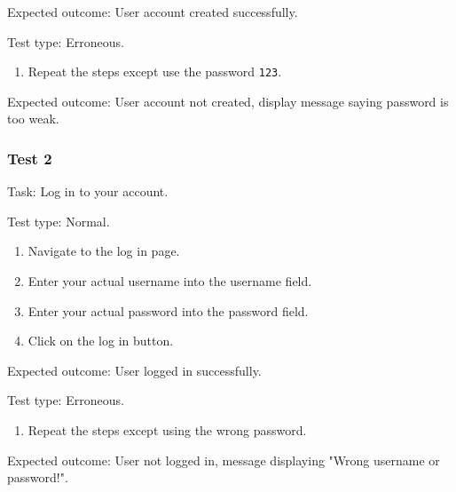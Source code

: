 {\sffamily Expected outcome:} User account created successfully.\\ 

{\color{gray} \hrulefill}

{\sffamily Test type: Erroneous.} \\ 

\begin{enumerate}
\item Repeat the steps except use the password \texttt{123}.  
\end{enumerate}

{\sffamily Expected outcome:} User account not created, display 
message saying password is too weak.\\

{\color{gray} \hrulefill}

\vspace{0.2cm}

\subsubsection{Test 2}

{\sffamily Task:} Log in to your account.\\ 

{\color{gray} \hrulefill}

{\sffamily Test type: Normal.}\\

\begin{enumerate}
  \item Navigate to the log in page.
  \item Enter your actual username into the username field.
  \item Enter your actual password into the password field.
  \item Click on the log in button.
\end{enumerate}

{\sffamily Expected outcome:} User logged in successfully. \\ 

{\color{gray} \hrulefill}

{\sffamily Test type: Erroneous.}\\

\begin{enumerate}
  \item Repeat the steps except using the wrong password.
\end{enumerate}

{\sffamily Expected outcome:} User not logged in,
message displaying "Wrong username or password!". \\ 


